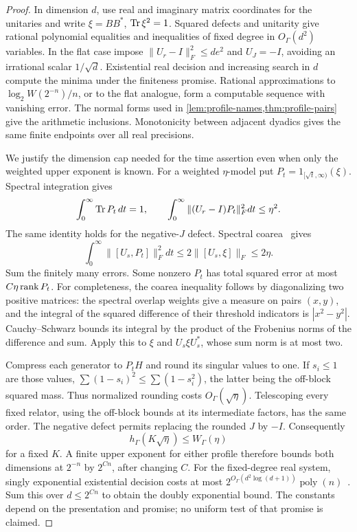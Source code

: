 \begin{proof}
In dimension $d$, use real and imaginary matrix coordinates for the unitaries and write $\xi=BB^*$, $\operatorname{Tr}\xi^2=1$. Squared defects and unitarity give rational polynomial equalities and inequalities of fixed degree in $O_\Gamma(d^2)$ variables. In the flat case impose $\|U_r-I\|_F^2\le de^2$ and $U_J=-I$, avoiding an irrational scalar $1/\sqrt d$. Existential real decision and increasing search in $d$ compute the minima under the finiteness promise. Rational approximations to $\log_2W(2^{-n})/n$, or to the flat analogue, form a computable sequence with vanishing error. The normal forms used in \cref{lem:profile-names,thm:profile-pairs} give the arithmetic inclusions. Monotonicity between adjacent dyadics gives the same finite endpoints over all real precisions.

We justify the dimension cap needed for the time assertion even when only the weighted upper exponent is known. For a weighted $\eta$-model put $P_t=1_{[\sqrt t,\infty)}(\xi)$. Spectral integration gives
\[
 \int_0^\infty\operatorname{Tr} P_t\,dt=1,\qquad
 \int_0^\infty\|(U_r-I)P_t\|_F^2dt\le\eta^2.
\]
The same identity holds for the negative-$J$ defect. Spectral coarea~\cite[Lemma~5.5]{SV18} gives
\[
 \int_0^\infty\|[U_s,P_t]\|_F^2dt
 \le2\|[U_s,\xi]\|_F\le2\eta.
\]
Sum the finitely many errors. Some nonzero $P_t$ has total squared error at most $C\eta\operatorname{rank} P_t$. For completeness, the coarea inequality follows by diagonalizing two positive matrices: the spectral overlap weights give a measure on pairs $(x,y)$, and the integral of the squared difference of their threshold indicators is $|x^2-y^2|$. Cauchy--Schwarz bounds its integral by the product of the Frobenius norms of the difference and sum. Apply this to $\xi$ and $U_s\xi U_s^*$, whose sum norm is at most two.

Compress each generator to $P_tH$ and round its singular values to one. If $s_i\le1$ are those values, $\sum(1-s_i)^2\le\sum(1-s_i^2)$, the latter being the off-block squared mass. Thus normalized rounding costs $O_\Gamma(\sqrt\eta)$. Telescoping every fixed relator, using the off-block bounds at its intermediate factors, has the same order. The negative defect permits replacing the rounded $J$ by $-I$. Consequently
\[
 h_\Gamma(K\sqrt\eta)\le W_\Gamma(\eta)
\]
for a fixed $K$. A finite upper exponent for either profile therefore bounds both dimensions at $2^{-n}$ by $2^{Cn}$, after changing $C$. For the fixed-degree real system, singly exponential existential decision costs at most $2^{O_\Gamma(d^2\log(d+1))}\operatorname{poly}(n)$~\cite{Basu14}. Sum this over $d\le2^{Cn}$ to obtain the doubly exponential bound. The constants depend on the presentation and promise; no uniform test of that promise is claimed.


\end{proof}
